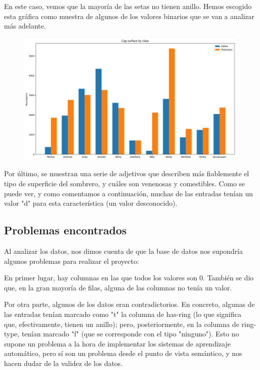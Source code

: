 \documentclass[11pt]{article}
\begin{document}
	En este caso, vemos que la mayoría de las setas no tienen anillo. Hemos escogido esta gráfica como muestra de algunos de los valores binarios que se van a analizar más adelante.
    
 \begin{figure}[H]
    \begin{center}
    \includegraphics[width=\textwidth]{Results/Analysis/03CapSurface.png}
    \end{center}
 \end{figure}

Por último, se muestran una serie de adjetivos que describen más fiablemente el tipo de superficie del sombrero, y cuáles son venenosas y comestibles. Como se puede ver, y como comentamos a continuación, muchas de las entradas tenían un valor "d" para esta característica (un valor desconocido).

\newpage
\subsection{Problemas encontrados}

Al analizar los datos, nos dimos cuenta de que la base de datos nos supondría algunos problemas para realizar el proyecto:

En primer lugar, hay columnas en las que todos los valores son 0. También se dio que, en la gran mayoría de filas, alguna de las columnas no tenía un valor. 

Por otra parte, algunos de los datos eran contradictorios. En concreto, algunas de las entradas tenían marcado como "t" la columna de has-ring (lo que significa que, efectivamente, tienen un anillo); pero, posteriormente, en la columna de ring-type, tenían marcado "f" (que se corresponde con el tipo "ninguno"). Esto no supone un problema a la hora de implementar los sistemas de aprendizaje automático, pero sí son un problema desde el punto de vista semántico, y nos hacen dudar de la validez de los datos.
\end{document}
